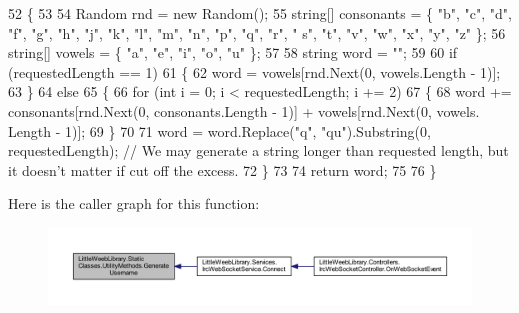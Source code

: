 \begin{DoxyCode}
52         \{
53             
54             Random rnd = \textcolor{keyword}{new} Random();
55             \textcolor{keywordtype}{string}[] consonants = \{ \textcolor{stringliteral}{"b"}, \textcolor{stringliteral}{"c"}, \textcolor{stringliteral}{"d"}, \textcolor{stringliteral}{"f"}, \textcolor{stringliteral}{"g"}, \textcolor{stringliteral}{"h"}, \textcolor{stringliteral}{"j"}, \textcolor{stringliteral}{"k"}, \textcolor{stringliteral}{"l"}, \textcolor{stringliteral}{"m"}, \textcolor{stringliteral}{"n"}, \textcolor{stringliteral}{"p"}, \textcolor{stringliteral}{"q"}, \textcolor{stringliteral}{"r"}, \textcolor{stringliteral}{"
      s"}, \textcolor{stringliteral}{"t"}, \textcolor{stringliteral}{"v"}, \textcolor{stringliteral}{"w"}, \textcolor{stringliteral}{"x"}, \textcolor{stringliteral}{"y"}, \textcolor{stringliteral}{"z"} \};
56             \textcolor{keywordtype}{string}[] vowels = \{ \textcolor{stringliteral}{"a"}, \textcolor{stringliteral}{"e"}, \textcolor{stringliteral}{"i"}, \textcolor{stringliteral}{"o"}, \textcolor{stringliteral}{"u"} \};
57 
58             \textcolor{keywordtype}{string} word = \textcolor{stringliteral}{""};
59 
60             \textcolor{keywordflow}{if} (requestedLength == 1)
61             \{
62                 word = vowels[rnd.Next(0, vowels.Length - 1)];
63             \}
64             \textcolor{keywordflow}{else}
65             \{
66                 \textcolor{keywordflow}{for} (\textcolor{keywordtype}{int} i = 0; i < requestedLength; i += 2)
67                 \{
68                     word += consonants[rnd.Next(0, consonants.Length - 1)] + vowels[rnd.Next(0, vowels.
      Length - 1)];
69                 \}
70 
71                 word = word.Replace(\textcolor{stringliteral}{"q"}, \textcolor{stringliteral}{"qu"}).Substring(0, requestedLength); \textcolor{comment}{// We may generate a string
       longer than requested length, but it doesn't matter if cut off the excess.}
72             \}
73 
74             \textcolor{keywordflow}{return} word;
75 
76         \}
\end{DoxyCode}
Here is the caller graph for this function\+:\nopagebreak
\begin{figure}[H]
\begin{center}
\leavevmode
\includegraphics[width=350pt]{class_little_weeb_library_1_1_static_classes_1_1_utility_methods_a9304b6462a585dd9afa13818452638a7_icgraph}
\end{center}
\end{figure}
